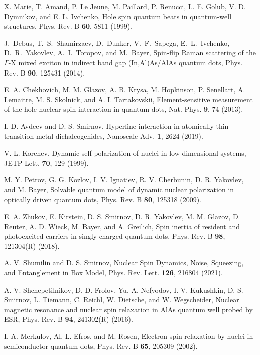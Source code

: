 \documentclass[twocolumn,showpacs,preprintnumbers,amsmath,amssymb,aps]{revtex4-1}
\begin{document}
\begin{thebibliography}{}
  X. Marie, T. Amand, P. Le Jeune, M. Paillard, P. Renucci, L. E. Golub, V. D. Dymnikov, and E. L. Ivchenko, Hole spin quantum
beats in quantum-well structures, Phys. Rev. B \textbf{60}, 5811 (1999).

 J.~Debus, T.~S.~Shamirzaev, D.~Dunker, V.~F.~Sapega, E.~L.~Ivchenko, D.~R.~Yakovlev, A.~I.~Toropov, and M.~Bayer, Spin-flip Raman scattering of the $\Gamma$-X mixed exciton in indirect band gap (In,Al)As/AlAs quantum dots, Phys. Rev. B \textbf{90}, 125431 (2014).

  E. A. Chekhovich, M. M. Glazov, A. B. Krysa, M. Hopkinson, P. Senellart, A. Lemaitre, M. S. Skolnick, and A. I. Tartakovskii, Element-sensitive measurement of the hole-nuclear spin interaction in quantum dots, Nat. Phys. \textbf{9}, 74 (2013).

 I. D. Avdeev and D. S. Smirnov, Hyperfine interaction in atomically thin transition metal dichalcogenides, Nanoscale Adv. \textbf{1}, 2624 (2019).

 V. L. Korenev, Dynamic self-polarization of nuclei in low-dimensional systems, JETP Lett. \textbf{70}, 129 (1999).

 M. Y. Petrov, G. G. Kozlov, I. V. Ignatiev, R. V. Cherbunin, D. R. Yakovlev, and M. Bayer, Solvable quantum model of dynamic nuclear polarization in optically driven quantum dots, Phys. Rev. B \textbf{80}, 125318 (2009).

 E. A. Zhukov, E. Kirstein, D. S. Smirnov, D. R. Yakovlev,
M. M. Glazov, D. Reuter, A. D. Wieck, M. Bayer, and A. Greilich, Spin inertia of resident and photoexcited carriers in singly charged quantum dots, Phys. Rev. B \textbf{98}, 121304(R) (2018).

 A. V. Shumilin and D. S. Smirnov, Nuclear Spin Dynamics, Noise, Squeezing, and Entanglement in Box Model, Phys. Rev. Lett. \textbf{126}, 216804
(2021).

 A. V. Shchepetilnikov, D. D. Frolov, Yu. A. Nefyodov, I. V. Kukushkin, D. S. Smirnov, L. Tiemann, C. Reichl, W. Dietsche, and W. Wegscheider, Nuclear magnetic resonance and nuclear spin relaxation in AlAs quantum well probed by ESR, Phys. Rev. B \textbf{94}, 241302(R) (2016).

 I. A. Merkulov, Al. L. Efros, and M. Rosen, Electron spin relaxation by nuclei in semiconductor quantum dots, Phys. Rev. B \textbf{65}, 205309 (2002).


\end{thebibliography}
\end{document}
